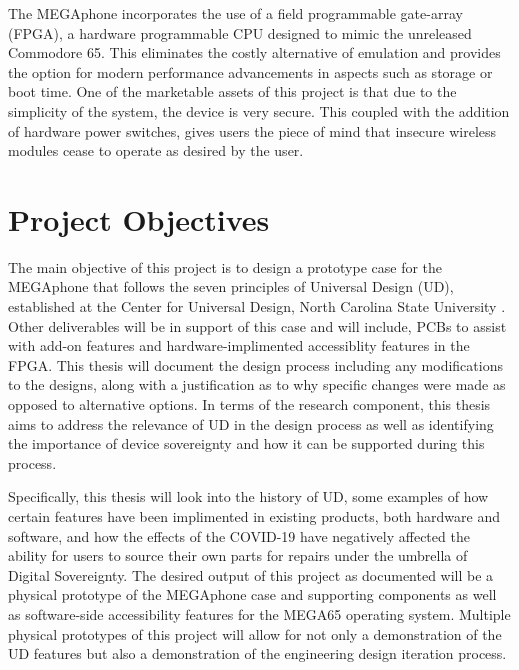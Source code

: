 The MEGAphone incorporates the use of a field programmable gate-array (FPGA), a hardware programmable CPU designed to mimic the unreleased Commodore 65.
This eliminates the costly alternative of emulation and provides the option for modern performance advancements in aspects such as storage or boot time.
One of the marketable assets of this project is that due to the simplicity of the system, the device is very secure.
This coupled with the addition of hardware power switches, gives users the piece of mind that insecure wireless modules cease to operate as desired by the user.

\section{Project Objectives}

The main objective of this project is to design a prototype case for the MEGAphone that follows the seven principles of Universal Design (UD), established at the Center for Universal Design, North Carolina State University \cite{sevenprinciples}. 
Other deliverables will be in support of this case and will include, PCBs to assist with add-on features and hardware-implimented accessiblity features in the FPGA.
This thesis will document the design process including any modifications to the designs, along with a justification as to why specific changes were made as opposed to alternative options.
In terms of the research component, this thesis aims to address the relevance of UD in the design process as well as identifying the importance of device sovereignty and how it can be supported during this process.

Specifically, this thesis will look into the history of UD, some examples of how certain features have been implimented in existing products, both hardware and software, and how the effects of the COVID-19 have negatively affected the ability for users to source their own parts for repairs under the umbrella of Digital Sovereignty.
The desired output of this project as documented will be a physical prototype of the MEGAphone case and supporting components as well as software-side accessibility features for the MEGA65 operating system.
Multiple physical prototypes of this project will allow for not only a demonstration of the UD features but also a demonstration of the engineering design iteration process.
 
